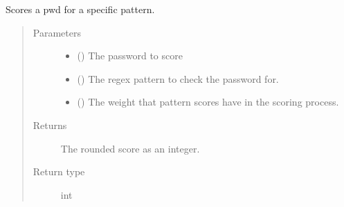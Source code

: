 \documentclass[letterpaper,10pt,english]{sphinxmanual}
\begin{document}
\begin{fulllineitems}
\begin{fulllineitems}
\end{fulllineitems}


\begin{fulllineitems}
\label{\detokenize{EntroPass:EntroPass.pwd_score.Pwd_score.score_pwd_pattern}}
\sphinxAtStartPar
Scores a pwd for a specific pattern.
\begin{quote}\begin{description}
\item[{Parameters}] \leavevmode\begin{itemize}
\item {} 
\sphinxAtStartPar
{} () \textendash{} The password to score

\item {} 
\sphinxAtStartPar
{} () \textendash{} The regex pattern to check the password for.

\item {} 
\sphinxAtStartPar
{} (\sphinxstyleliteralemphasis{\sphinxupquote{, }}) \textendash{} The weight that pattern scores have in the scoring process.

\end{itemize}

\item[{Returns}] \leavevmode
\sphinxAtStartPar
The rounded score as an integer.

\item[{Return type}] \leavevmode
\sphinxAtStartPar
int

\end{description}\end{quote}

\end{fulllineitems}


\end{fulllineitems}
\end{document}
